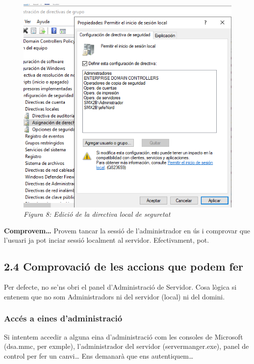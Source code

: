 \documentclass[
  a4paper,
]{article}
\begin{document}
\begin{figure}
\centering
\includegraphics{png/EditarDirectiva4.png}
\caption{\emph{Figura 8: Edició de la directiva local de seguretat}}
\end{figure}

\textbf{Comprovem\ldots{}} Provem tancar la sessió de l'administrador en
ús i comprovar que l'usuari ja pot inciar sessió localment al servidor.
Efectivament, pot.

\subsection{2.4 Comprovació de les accions que podem
fer}\label{comprovaciuxf3-de-les-accions-que-podem-fer}

Per defecte, no se'ns obri el panel d'Administració de Servidor. Cosa
lògica si entenem que no som Administradors ni del servidor (local) ni
del domini.

\subsubsection{Accés a eines
d'administració}\label{accuxe9s-a-eines-dadministraciuxf3}

Si intentem accedir a alguna eina d'administració com les consoles de
Microsoft (dsa.mmc, per exmple), l'administrador del servidor
(servermanger.exe), panel de control per fer un canvi\ldots{} Ens
demanarà que ens autentiquem\ldots{}
\end{document}
